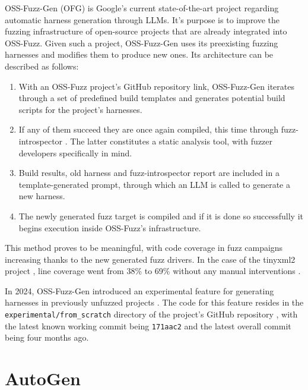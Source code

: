\documentclass[
  a4paper,
]{scrreprt}
\providecommand{\tightlist}{%
  \setlength{\itemsep}{0pt}\setlength{\parskip}{0pt}}
\theoremstyle{definition}
\theoremstyle{remark}
\begin{document}
OSS-Fuzz-Gen (OFG) \autocite{liu2023,oss-fuzz-gen} is Google's current
state-of-the-art project regarding automatic harness generation through
LLMs. It's purpose is to improve the fuzzing infrastructure of
open-source projects that are already integrated into OSS-Fuzz. Given
such a project, OSS-Fuzz-Gen uses its preexisting fuzzing harnesses and
modifies them to produce new ones. Its architecture can be described as
follows:

\begin{enumerate}
\def\labelenumi{\arabic{enumi}.}
\tightlist
\item
  With an OSS-Fuzz project's GitHub repository link, OSS-Fuzz-Gen
  iterates through a set of predefined build templates and generates
  potential build scripts for the project's harnesses.
\item
  If any of them succeed they are once again compiled, this time through
  fuzz-introspector \autocite{fuzz-introspector}. The latter constitutes
  a static analysis tool, with fuzzer developers specifically in mind.
\item
  Build results, old harness and fuzz-introspector report are included
  in a template-generated prompt, through which an LLM is called to
  generate a new harness.
\item
  The newly generated fuzz target is compiled and if it is done so
  successfully it begins execution inside OSS-Fuzz's infrastructure.
\end{enumerate}

This method proves to be meaningful, with code coverage in fuzz
campaigns increasing thanks to the new generated fuzz drivers. In the
case of the tinyxml2 project \autocite{thomason2025}, line coverage went
from 38\% to 69\% without any manual interventions \autocite{liu2023}.

In 2024, OSS-Fuzz-Gen introduced an experimental feature for generating
harnesses in previously unfuzzed projects
\autocite{oss-fuzzmaintainers2024}. The code for this feature resides in
the \texttt{experimental/from\_scratch} directory of the project's
GitHub repository \autocite{oss-fuzz-gen}, with the latest known working
commit being \texttt{171aac2} and the latest overall commit being four
months ago.

\section{AutoGen}\label{autogen}
\end{document}
